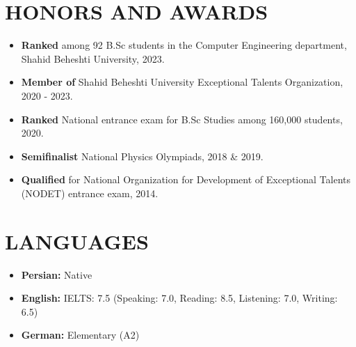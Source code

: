 \documentclass[11pt,a4paper,sans]{moderncv}        %
\begin{document}
\section{HONORS AND AWARDS}

\vspace{4pt}

\begin{itemize}
\item \textbf{Ranked } among 92 B.Sc students in the Computer Engineering department, Shahid Beheshti University, 2023.
\end{itemize}
 
\begin{itemize}
\item  \textbf{Member of} Shahid Beheshti University Exceptional Talents Organization, 2020 - 2023.
\end{itemize}
\begin{itemize}
\item \textbf{Ranked }{National entrance exam for B.Sc Studies among 160,000 students, 2020.}
\end{itemize}
\begin{itemize}
\item \textbf{Semifinalist}{{ National Physics Olympiads}, 2018 \& 2019.}
\end{itemize}
\begin{itemize}
\item  \textbf{Qualified}{{ for National Organization for Development of Exceptional Talents (NODET) entrance exam}, 2014.}
\end{itemize}
\vspace{2pt}

\section{LANGUAGES}

\vspace{1pt}

\begin{itemize}

\item \textbf{Persian:} Native

\vspace{1pt}

\item \textbf{English:} IELTS: 7.5 (Speaking: 7.0, Reading: 8.5, Listening: 7.0, Writing: 6.5)

\vspace{1pt}

\item \textbf{German:} Elementary (A2)

\end{itemize}
\vspace{-2pt}
\end{document}
